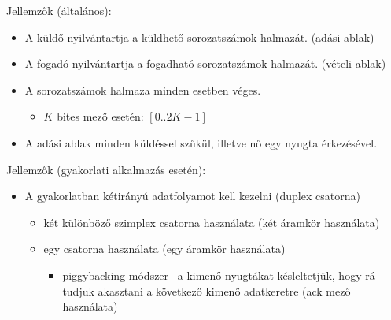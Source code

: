 \documentclass[12pt]{article}
\begin{document}
    \noindent Jellemzők (általános):
    \begin{itemize}[leftmargin=7.5mm]
        \renewcommand{\labelitemi}{$\vcenter{\hbox{\tiny$\bullet$}}$}
        \item A küldő nyilvántartja a küldhető sorozatszámok halmazát. (adási ablak)
        \item A fogadó nyilvántartja a fogadható sorozatszámok halmazát. (vételi ablak)
        \item A sorozatszámok halmaza minden esetben véges.
        \begin{itemize}[leftmargin=7.5mm]
            \renewcommand{\labelitemii}{$\vcenter{\hbox{\tiny$\circ$}}$}
            \item $K$ bites mező esetén: $[0..2K-1]$
        \end{itemize}
        \item A adási ablak minden küldéssel szűkül, illetve nő egy nyugta érkezésével.\\
        \end{itemize}

    \noindent Jellemzők (gyakorlati alkalmazás esetén):
    \begin{itemize}[leftmargin=7.5mm]
        \renewcommand{\labelitemi}{$\vcenter{\hbox{\tiny$\bullet$}}$}
        \item A gyakorlatban kétirányú adatfolyamot kell kezelni (duplex csatorna)
        \begin{itemize}[leftmargin=7.5mm]
            \renewcommand{\labelitemii}{$\vcenter{\hbox{\tiny$\circ$}}$}
                \item két különböző szimplex csatorna használata (két áramkör használata)
                \item egy csatorna használata (egy áramkör használata)
                \begin{itemize}[leftmargin=7.5mm]
                    \renewcommand{\labelitemiii}{$\vcenter{\hbox{\tiny$\diamond$}}$}
                    \item piggybacking módszer– a kimenő nyugtákat késleltetjük, hogy rá tudjuk akasztani a következő kimenő adatkeretre (ack mező használata)
                \end{itemize}
        \end{itemize}
    \end{itemize}
\end{document}
